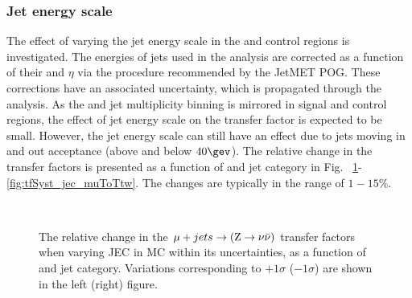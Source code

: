 \subsubsection*{Jet energy scale}
\label{sec:tfSyst_jec}
The effect of varying the jet energy scale in
the \mj and \mmj control regions is investigated.  The energies of
jets used in the analysis are corrected as a function of their \pt and
$\eta$ via the procedure recommended by the JetMET POG. These
corrections have an associated uncertainty, which is propagated through the analysis. 
As the \scalht and jet multiplicity binning is mirrored in signal and control regions, 
the effect of jet energy scale on the transfer factor is expected to be small. 
However, the jet energy scale can still have an
effect due to jets moving in and out acceptance (above and below
$40\gev$). The relative change in the transfer factors is presented as a function of \scalht and jet category 
in Fig. ~\ref{fig:tfSyst_jec_muToZinv}-\ref{fig:tfSyst_jec_muToTtw}.
The changes are typically in the range of $1-15\%$.


\begin{figure}[!h]
  \centering
   ~~
  \\

  \caption{\label{fig:tfSyst_jec_muToZinv} The relative change in the
  $\mu + jets \rightarrow ({\text Z} \rightarrow \nu\bar{\nu})$ transfer
  factors when varying JEC in MC within its uncertainties, as a function of \scalht and jet category. 
  Variations corresponding to $+1\sigma$ ($-1\sigma$) are shown in the left (right) figure. 
  }
\end{figure}

